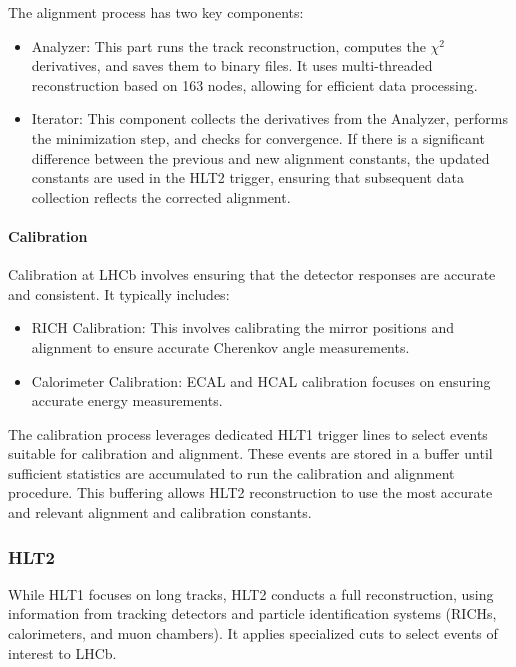 The alignment process has two key components:
\begin{itemize}
\item Analyzer: This part runs the track reconstruction, computes the $\chi^2$ derivatives, and saves them to binary files. It uses multi-threaded reconstruction based on 163 nodes, allowing for efficient data processing.
\item Iterator: This component collects the derivatives from the Analyzer, performs the minimization step, and checks for convergence. If there is a significant difference between the previous and new alignment constants, the updated constants are used in the HLT2 trigger, ensuring that subsequent data collection reflects the corrected alignment.
\end{itemize}
\paragraph{Calibration}
Calibration at LHCb involves ensuring that the detector responses are accurate and consistent. It typically includes:
\begin{itemize}
\item RICH Calibration: This involves calibrating the mirror positions and alignment to ensure accurate Cherenkov angle measurements.
\item Calorimeter Calibration: ECAL and HCAL calibration focuses on ensuring accurate energy measurements.
\end{itemize}
The calibration process leverages dedicated HLT1 trigger lines to select events suitable for calibration and alignment. These events are stored in a buffer until sufficient statistics are accumulated to run the calibration and alignment procedure. This buffering allows HLT2 reconstruction to use the most accurate and relevant alignment and calibration constants.
\subsubsection{HLT2}
While HLT1 focuses on long tracks, HLT2 conducts a full reconstruction, using information from tracking detectors and particle identification systems (RICHs, calorimeters, and muon chambers). It applies specialized cuts to select events of interest to LHCb.

